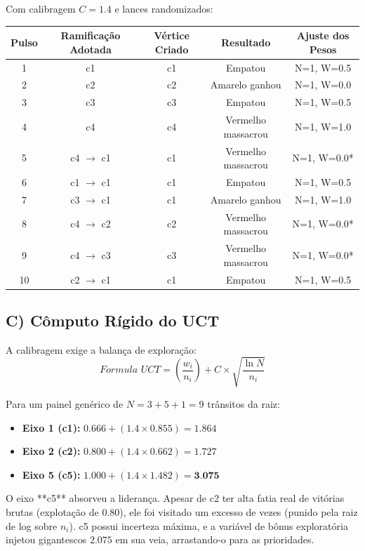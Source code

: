 Com calibragem $C=1.4$ e lances randomizados:

\begin{table}[H]
\centering
\begin{tabular}{|c|c|c|c|c|}
\hline
\textbf{Pulso} & \textbf{Ramificação Adotada} & \textbf{Vértice Criado} & \textbf{Resultado} & \textbf{Ajuste dos Pesos} \\ \hline
1 & c1 & c1 & Empatou & N=1, W=0.5 \\ \hline
2 & c2 & c2 & Amarelo ganhou & N=1, W=0.0 \\ \hline
3 & c3 & c3 & Empatou & N=1, W=0.5 \\ \hline
4 & c4 & c4 & Vermelho massacrou & N=1, W=1.0 \\ \hline
5 & c4 $\rightarrow$ c1 & c1 & Vermelho massacrou & N=1, W=0.0* \\ \hline
6 & c1 $\rightarrow$ c1 & c1 & Empatou & N=1, W=0.5 \\ \hline
7 & c3 $\rightarrow$ c1 & c1 & Amarelo ganhou & N=1, W=1.0 \\ \hline
8 & c4 $\rightarrow$ c2 & c2 & Vermelho massacrou & N=1, W=0.0* \\ \hline
9 & c4 $\rightarrow$ c3 & c3 & Vermelho massacrou & N=1, W=0.0* \\ \hline
10 & c2 $\rightarrow$ c1 & c1 & Empatou & N=1, W=0.5 \\ \hline
\end{tabular}
\end{table}

\subsection*{C) Cômputo Rígido do UCT}

A calibragem exige a balança de exploração:
\[ Formula \,\, UCT = \left(\frac{w_i}{n_i}\right) + C \times \sqrt{\frac{\ln N}{n_i}} \]

Para um painel genérico de $N = 3 + 5 + 1 = 9$ trânsitos da raiz:

\begin{itemize}
    \item \textbf{Eixo 1 (c1):} $0.666 + (1.4 \times 0.855) = 1.864$
    \item \textbf{Eixo 2 (c2):} $0.800 + (1.4 \times 0.662) = 1.727$
    \item \textbf{Eixo 5 (c5):} $1.000 + (1.4 \times 1.482) = \textbf{3.075}$
\end{itemize}

O eixo **c5** absorveu a liderança. Apesar de c2 ter alta fatia real de vitórias brutas (explotação de $0.80$), ele foi visitado um excesso de vezes (punido pela raiz de log sobre $n_i$). c5 possui incerteza máxima, e a variável de bônus exploratória injetou gigantescos $2.075$ em sua veia, arrastando-o para as prioridades.

